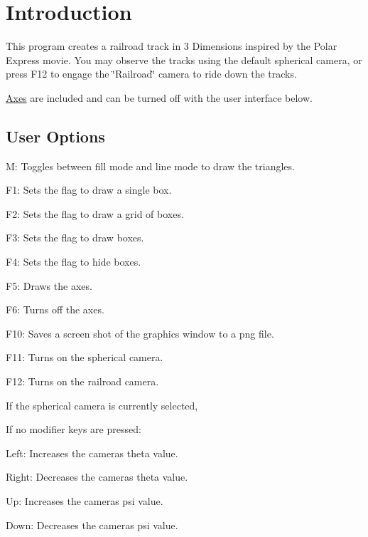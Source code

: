 \hypertarget{index_intro}{}\section{Introduction}\label{index_intro}
This program creates a railroad track in 3 Dimensions inspired by the Polar Express movie. You may observe the tracks using the default spherical camera, or press F12 to engage the \char`\"{}\+Railroad\char`\"{} camera to ride down the tracks.

\hyperlink{class_axes}{Axes} are included and can be turned off with the user interface below.\hypertarget{index_options}{}\subsection{User Options}\label{index_options}

\begin{DoxyItemize}
\item M\+: Toggles between fill mode and line mode to draw the triangles.
\item F1\+: Sets the flag to draw a single box.
\item F2\+: Sets the flag to draw a grid of boxes.
\item F3\+: Sets the flag to draw boxes.
\item F4\+: Sets the flag to hide boxes.
\item F5\+: Draws the axes.
\item F6\+: Turns off the axes.
\item F10\+: Saves a screen shot of the graphics window to a png file.
\item F11\+: Turns on the spherical camera.
\item F12\+: Turns on the railroad camera.
\end{DoxyItemize}

If the spherical camera is currently selected,

If no modifier keys are pressed\+:


\begin{DoxyItemize}
\item Left\+: Increases the camera\textquotesingle{}s theta value.
\item Right\+: Decreases the camera\textquotesingle{}s theta value.
\item Up\+: Increases the camera\textquotesingle{}s psi value.
\item Down\+: Decreases the camera\textquotesingle{}s psi value.
\end{DoxyItemize}

